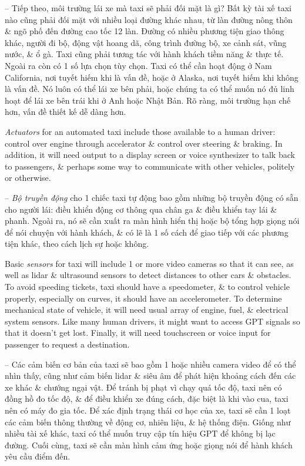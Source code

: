 \documentclass{article}
\begin{document}
\begin{itemize}
\begin{itemize}
\begin{itemize}
\begin{itemize}
				-- Tiếp theo, môi trường lái xe mà taxi sẽ phải đối mặt là gì? Bất kỳ tài xế taxi nào cũng phải đối mặt với nhiều loại đường khác nhau, từ làn đường nông thôn \& ngõ phố đến đường cao tốc 12 làn. Đường có nhiều phương tiện giao thông khác, người đi bộ, động vật hoang dã, công trình đường bộ, xe cảnh sát, vũng nước, \& ổ gà. Taxi cũng phải tương tác với hành khách tiềm năng \& thực tế. Ngoài ra còn có 1 số lựa chọn tùy chọn. Taxi có thể cần hoạt động ở Nam California, nơi tuyết hiếm khi là vấn đề, hoặc ở Alaska, nơi tuyết hiếm khi không là vấn đề. Nó luôn có thể lái xe bên phải, hoặc chúng ta có thể muốn nó đủ linh hoạt để lái xe bên trái khi ở Anh hoặc Nhật Bản. Rõ ràng, môi trường hạn chế hơn, vấn đề thiết kế dễ dàng hơn.
				
				{\it Actuators} for an automated taxi include those available to a human driver: control over engine through accelerator \& control over steering \& braking. In addition, it will need output to a display screen or voice synthesizer to talk back to passengers, \& perhaps some way to communicate with other vehicles, politely or otherwise.
				
				-- {\it Bộ truyền động} cho 1 chiếc taxi tự động bao gồm những bộ truyền động có sẵn cho người lái: điều khiển động cơ thông qua chân ga \& điều khiển tay lái \& phanh. Ngoài ra, nó sẽ cần xuất ra màn hình hiển thị hoặc bộ tổng hợp giọng nói để nói chuyện với hành khách, \& có lẽ là 1 số cách để giao tiếp với các phương tiện khác, theo cách lịch sự hoặc không.
				
				Basic {\it sensors} for taxi will include 1 or more video cameras so that it can see, as well as lidar \& ultrasound sensors to detect distances to other cars \& obstacles. To avoid speeding tickets, taxi should have a speedometer, \& to control vehicle properly, especially on curves, it should have an accelerometer. To determine mechanical state of vehicle, it will need usual array of engine, fuel, \& electrical system sensors. Like many human drivers, it might want to access GPT signals so that it doesn't get lost. Finally, it will need touchscreen or voice input for passenger to request a destination.
				
				-- Các cảm biến cơ bản của taxi sẽ bao gồm 1 hoặc nhiều camera video để có thể nhìn thấy, cũng như cảm biến lidar \& siêu âm để phát hiện khoảng cách đến các xe khác \& chướng ngại vật. Để tránh bị phạt vì chạy quá tốc độ, taxi nên có đồng hồ đo tốc độ, \& để điều khiển xe đúng cách, đặc biệt là khi vào cua, taxi nên có máy đo gia tốc. Để xác định trạng thái cơ học của xe, taxi sẽ cần 1 loạt các cảm biến thông thường về động cơ, nhiên liệu, \& hệ thống điện. Giống như nhiều tài xế khác, taxi có thể muốn truy cập tín hiệu GPT để không bị lạc đường. Cuối cùng, taxi sẽ cần màn hình cảm ứng hoặc giọng nói để hành khách yêu cầu điểm đến.
				

\end{itemize}
\end{itemize}
\end{itemize}
\end{itemize}
\end{document}
